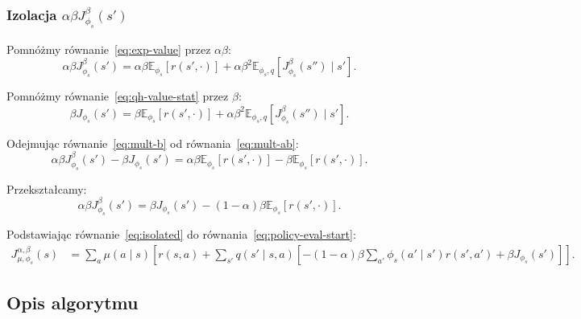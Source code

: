 \subsubsection{Izolacja $\alpha \beta J^{\beta}_{\phi_s}(s')$}

Pomnóżmy równanie~\eqref{eq:exp-value} przez $\alpha \beta$:
\begin{equation}
\alpha \beta J^{\beta}_{\phi_s}(s') = \alpha \beta \mathbb{E}_{\phi_s} [r(s', \cdot)] + \alpha \beta^2 \mathbb{E}_{\phi_s, q} [J^{\beta}_{\phi_s}(s'') \mid s'].
\label{eq:mult-ab}
\end{equation}

Pomnóżmy równanie~\eqref{eq:qh-value-stat} przez $\beta$:
\begin{equation}
\beta J_{\phi_s}(s') = \beta \mathbb{E}_{\phi_s} [r(s', \cdot)] + \alpha \beta^2 \mathbb{E}_{\phi_s, q} [J^{\beta}_{\phi_s}(s'') \mid s'].
\label{eq:mult-b}
\end{equation}

Odejmując równanie~\eqref{eq:mult-b} od równania~\eqref{eq:mult-ab}:
\begin{equation}
\alpha \beta J^{\beta}_{\phi_s}(s') - \beta J_{\phi_s}(s') = \alpha \beta \mathbb{E}_{\phi_s} [r(s', \cdot)] - \beta \mathbb{E}_{\phi_s} [r(s', \cdot)].
\end{equation}

Przekształcamy:
\begin{equation}
\alpha \beta J^{\beta}_{\phi_s}(s') = \beta J_{\phi_s}(s') - (1 - \alpha) \beta \mathbb{E}_{\phi_s} [r(s', \cdot)].
\label{eq:isolated}
\end{equation}

Podstawiając równanie~\eqref{eq:isolated} do równania~\eqref{eq:policy-eval-start}:
\begin{align}
J^{\alpha, \beta}_{\mu, \phi_s}(s) &= \sum_a \mu(a\mid s) \left[ r(s, a) + \sum_{s'} q(s'\mid s, a) \left[ -(1 - \alpha)\beta \sum_{a'} \phi_s(a'\mid s') r(s', a') + \beta J_{\phi_s}(s') \right] \right].
\label{eq:final-policy-eval}
\end{align}

\subsection{Opis algorytmu}

